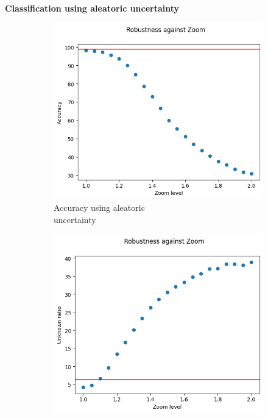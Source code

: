 \vspace{0.3cm}
\textbf{Classification using aleatoric uncertainty}
\vspace{0.1cm}


\begin{figure}[h]
	\centering
	\begin{subfigure}{.33\textwidth}
		\centering
		\includegraphics[width=0.9\linewidth]{ImageFiles/EvalBNN/ZO/AU/acc}
		\caption{Accuracy using aleatoric \\ uncertainty}
		\label{fig:zo_au_acc}
	\end{subfigure}%
	\begin{subfigure}{.33\textwidth}
		\centering
		\includegraphics[width=0.9\linewidth]{ImageFiles/EvalBNN/ZO/AU/unkn}

\end{subfigure}
\end{figure}
